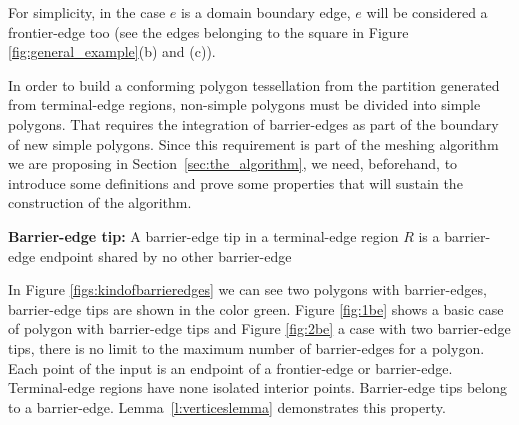 \noindent
For simplicity, in the case  $e$ is a domain boundary edge, $e$ will be considered a frontier-edge too (see the edges belonging to the square in Figure \ref{fig:general_example}(b) and (c)). 
  

In order to build a conforming polygon tessellation from the partition generated from terminal-edge regions, non-simple polygons must be divided into simple polygons. That requires the integration of barrier-edges as part of the boundary of new simple polygons.  Since this requirement is part of the meshing algorithm we are proposing in Section~\ref{sec:the_algorithm}, we need, beforehand, to introduce some definitions and prove some properties that will sustain the construction of the algorithm.


\begin{definition}{\textbf{Barrier-edge tip:}}
\label{d:barrier-edge}
A barrier-edge tip in a terminal-edge region $R$ is a barrier-edge endpoint shared by no other barrier-edge%
\end{definition}

 
In Figure \ref{figs:kindofbarrieredges} we can see two polygons with barrier-edges, barrier-edge tips are shown in the color green. Figure \ref{fig:1be} shows a basic case of polygon with barrier-edge tips and Figure \ref{fig:2be} a case with two barrier-edge tips, there is no limit to the maximum number of barrier-edges for a polygon. Each point of the input is an endpoint of a frontier-edge or barrier-edge. Terminal-edge regions have none isolated interior points. Barrier-edge tips belong to a barrier-edge. Lemma~\ref{l:verticeslemma} demonstrates this property.


